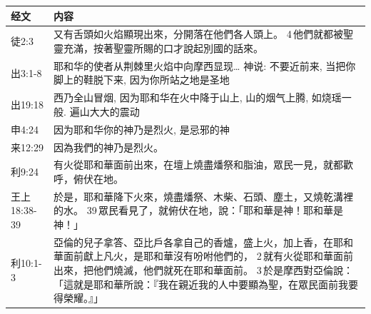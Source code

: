 \begin{table}[H]
\centering
\begin{tabular}{p{6em}|p{40em}}  \toprule
经文&内容\\  \midrule
徒2:3&又有舌頭如火焰顯現出來，分開落在他們各人頭上。 4 他們就都被聖靈充滿，按著聖靈所賜的口才說起別國的話來。\\  \midrule
出3:1-8&耶和华的使者从荆棘里火焰中向摩西显现… 神说: 不要近前来, 当把你脚上的鞋脱下来, 因为你所站之地是圣地\\  \midrule

出19:18&西乃全山冒烟, 因为耶和华在火中降于山上, 山的烟气上腾, 如烧瑶一般. 遍山大大的震动\\  \midrule
申4:24&因为耶和华你的神乃是烈火, 是忌邪的神\\  \midrule
来12:29&因為我們的神乃是烈火。\\  \midrule

 
利9:24&有火從耶和華面前出來，在壇上燒盡燔祭和脂油，眾民一見，就都歡呼，俯伏在地。\\  \midrule
王上18:38-39&於是，耶和華降下火來，燒盡燔祭、木柴、石頭、塵土，又燒乾溝裡的水。 39 眾民看見了，就俯伏在地，說：「耶和華是神！耶和華是神！」\\  \midrule
利10:1-3&亞倫的兒子拿答、亞比戶各拿自己的香爐，盛上火，加上香，在耶和華面前獻上凡火，是耶和華沒有吩咐他們的， 2 就有火從耶和華面前出來，把他們燒滅，他們就死在耶和華面前。 3 於是摩西對亞倫說：「這就是耶和華所說：『我在親近我的人中要顯為聖，在眾民面前我要得榮耀。』」\\  \midrule
\end{tabular}
\end{table}
 

